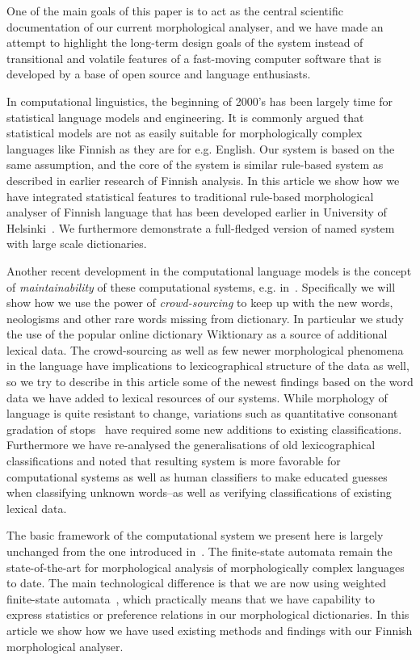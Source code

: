 \documentclass[a4paper,12pt]{article}
\begin{document}
One of the main goals of this paper is to act as the central scientific
documentation of our current morphological analyser, and we have made an
attempt to highlight the long-term design goals of the system instead of
transitional and volatile features of a fast-moving computer software that is
developed by a base of open source and language enthusiasts.

In computational linguistics, the beginning of 2000's has been largely time for
statistical language models and engineering. It is commonly argued that
statistical models are not as easily suitable for morphologically complex
languages like Finnish as they are for e.g. English. Our system is based on the
same assumption, and the core of the system is similar rule-based system as
described in earlier research of Finnish analysis. In this article we show how
we have integrated statistical features to traditional rule-based morphological
analyser of Finnish language that has been developed earlier in University of
Helsinki~\citep{pirinen2008suomen}. We furthermore demonstrate a full-fledged
version of named system with large scale dictionaries.

Another recent development in the computational language models is the concept
of \emph{maintainability} of these computational systems, e.g.
in~\cite{maxwell2008joint,pirinen2011modularisation}. Specifically we will show
how we use the power of \emph{crowd-sourcing} to keep up with the new words,
neologisms and other rare words missing from dictionary. In particular we study
the use of the popular online dictionary Wiktionary as a source of additional
lexical data. The crowd-sourcing as well as few newer morphological phenomena
in the language have implications to lexicographical structure of the data as
well, so we try to describe in this article some of the newest findings based
on the word data we have added to lexical resources of our systems. While
morphology of language is quite resistant to change, variations such as
quantitative consonant gradation of stops~\cite[§ 41]{visk} have required some
new additions to existing classifications. Furthermore we have re-analysed the
generalisations of old lexicographical classifications and noted that resulting
system is more favorable for computational systems as well as human classifiers
to make educated guesses when classifying unknown words–as well as verifying
classifications of existing lexical data.

The basic framework of the computational system we present here is largely
unchanged from the one introduced in~\cite{koskenniemi1983twolevel}. 
The finite-state automata remain the state-of-the-art for morphological analysis
of morphologically complex languages to date. The main
technological difference is that we are now using weighted finite-state 
automata~\cite{openfst}, which practically means that we have capability to
express statistics or preference relations in our morphological dictionaries.
In this article we show how we have used existing methods and findings with
our Finnish morphological analyser.
\end{document}
